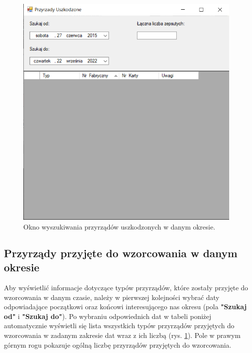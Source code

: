 \begin{figure}[htb]
	\centering
	\includegraphics{obrazki/Wyszukiwanie/przyrzady_uszkodzone.png}
	\caption{Okno wyszukiwania przyrządów uszkodzonych w danym okresie.}
	\label{przyrzadyUszkodzone}
\end{figure}

\subsection{Przyrządy przyjęte do wzorcowania w danym okresie}
\label{przyrzady_przyjete}

Aby wyświetlić informacje dotyczące typów przyrządów, które zostały przyjęte do wzorcowania w danym czasie, należy w pierwszej kolejności wybrać daty odpowiadające początkowi oraz końcowi interesującego nas okresu (pola \textbf{"Szukaj od"} i \textbf{"Szukaj do"}). Po wybraniu odpowiednich dat w tabeli poniżej automatycznie wyświetli się lista wszystkich typów przyrządów przyjętych do wzorcowania w zadanym zakresie dat wraz z ich liczbą  (rys. \ref{przyrzadyUszkodzone}).  Pole w prawym górnym rogu pokazuje ogólną liczbę przyrządów przyjętych do wzorcowania.

